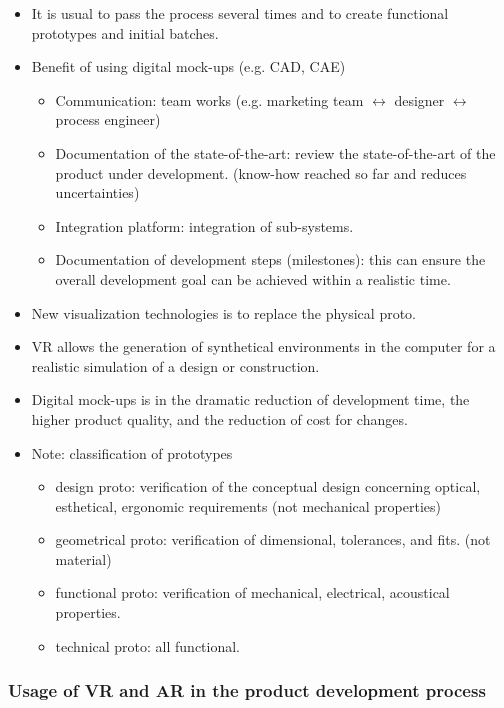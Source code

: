 \documentclass{standalone}
\begin{document}
\begin{itemize}
	\item It is usual to pass the process several times and to create functional prototypes and initial batches.
	\item Benefit of using digital mock-ups (e.g. CAD, CAE)
		\begin{itemize}
			\item Communication: team works (e.g. marketing team $\leftrightarrow$ designer $\leftrightarrow$ process engineer)
			\item Documentation of the state-of-the-art: review the state-of-the-art of the product under development. (know-how reached so far and reduces uncertainties)
			\item Integration platform: integration of sub-systems. 
			\item Documentation of development steps (milestones): this can ensure the overall development goal can be achieved within a realistic time. 
		\end{itemize}
	\item New visualization technologies is to replace the physical proto. 
	\item VR allows the generation of synthetical environments in the computer for a realistic simulation of a design or construction.
	\item Digital mock-ups is in the dramatic reduction of development time, the higher product quality, and the reduction of cost for changes.
\end{itemize}

\begin{itemize}
	\item Note: classification of prototypes
		\begin{itemize}
			\item design proto: verification of the conceptual design concerning optical, esthetical, ergonomic requirements (not mechanical properties)
			\item geometrical proto: verification of dimensional, tolerances, and fits. (not material)
			\item functional proto: verification of mechanical, electrical, acoustical properties.
			\item technical proto: all functional. 
		\end{itemize}
\end{itemize}



\subsubsection*{Usage of VR and AR in the product development process}
\end{document}
